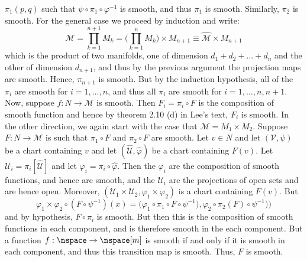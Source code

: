 \documentclass{article}                                                        %
\begin{document}
\begin{solution}
            $\pi_{1}(p,q)$ such that $\psi\circ\pi_{1}\circ\varphi^{\minus{1}}$
            is smooth, and thus $\pi_{1}$ is smooth. Similarly, $\pi_{2}$ is
            smooth. For the general case we proceed by induction and write:
            \begin{equation}
                \mathcal{M}=\prod_{k=1}^{n+1}M_{k}=
                    \Big(\prod_{k=1}^{n}M_{k}\Big)\times{M}_{n+1}
                \equiv\widehat{\mathcal{M}}\times{M}_{n+1}
            \end{equation}
            which is the product of two manifolds, one of dimension
            $d_{1}+d_{2}+\dots+d_{n}$ and the other of dimension $d_{n+1}$, and
            thus by the previous argument the projection maps are smooth. Hence,
            $\pi_{n+1}$ is smooth. But by the induction hypothesis, all of the
            $\pi_{i}$ are smooth for $i=1,\dots,n$, and thus all $\pi_{i}$ are
            smooth for $i=1,\dots,n,n+1$. Now, suppose
            $f:N\rightarrow\mathcal{M}$ is smooth. Then $F_{i}=\pi_{i}\circ{F}$
            is the composition of smooth function and hence by theorem 2.10 (d)
            in Lee's text, $F_{i}$ is smooth. In the other direction, we again
            start with the case that $\mathcal{M}=M_{1}\times{M}_{2}$. Suppose
            $F:N\rightarrow\mathcal{M}$ is such that $\pi_{1}\circ{F}$ and
            $\pi_{2}\circ{F}$ are smooth. Let $v\in{N}$ and let
            $(\mathcal{V},\psi)$ be a chart containing $v$ and let
            $(\widehat{\mathcal{U}},\widehat{\varphi})$ be a chart containing
            $F(v)$. Let $\mathcal{U}_{i}=\pi_{i}[\widehat{\mathcal{U}}]$ and
            let $\varphi_{i}=\pi_{i}\circ\widehat{\varphi}$. Then the
            $\varphi_{i}$ are the composition of smooth functions, and hence are
            smooth, and the $\mathcal{U}_{i}$ are the projections of open sets
            and are hence open. Moreover,
            $(\mathcal{U}_{1}\times\mathcal{U}_{2},%
             \varphi_{1}\times\varphi_{2})$ is a chart containing $F(v)$. But
            \begin{equation}
                \varphi_{1}\times\varphi_{2}\circ(F\circ\psi^{\minus{1}})(x)
                =\big(\varphi_{1}\circ\pi_{1}\circ{F}\circ\psi^{\minus{1}}),
                      \varphi_{2}\circ\pi_{2}(F)\circ\psi^{\minus{1}})\big)
            \end{equation}
            and by hypothesis, $F\circ\pi_{i}$ is smooth. But then this is the
            composition of smooth functions in each component, and is therefore
            smooth in the each component. But a function
            $f:\nspace\rightarrow\nspace[m]$ is smooth if and only if it is
            smooth in each component, and thus this transition map is smooth.
            Thus, $F$ is smooth.
        \end{solution}
\end{document}
